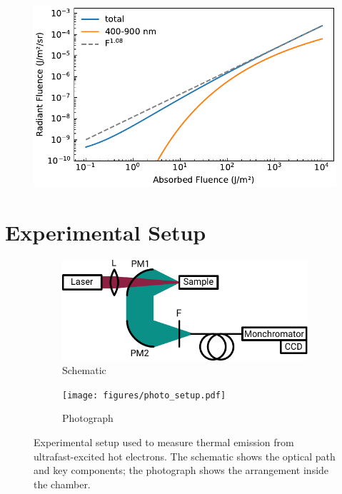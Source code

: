 \documentclass[
	parskip=half,
	a4paper,
]{scrarticle}
\begin{document}
\begin{figure}[h]
    \centering
    \includegraphics{../analysis/figures/powerscaling.pdf}
    \label{fig:powerscaling}
    \caption{}
\end{figure}


\clearpage
\section{Experimental Setup}
\begin{figure}[h]
    \centering
    \begin{subfigure}{3.5in}
        \centering
        \includegraphics{figures/setup.pdf}
        \caption{Schematic}
    \end{subfigure}\hfill
    \begin{subfigure}{2in}
        \centering
        \texttt{[image: figures/photo\_setup.pdf]}
        \caption{Photograph}
    \end{subfigure}
    \caption{Experimental setup used to measure thermal emission from ultrafast-excited hot electrons. The schematic shows the optical path and key components; the photograph shows the arrangement inside the chamber.}
    \label{fig:setup}
\end{figure}
\end{document}
